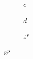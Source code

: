 \begin{frame}
\begin{columns}[T]
\begin{column}{0.6\textwidth}
\begin{figure}
        \begin{subfigure}{0.15\textwidth}
          \caption*{}
        \end{subfigure}
        \begin{subfigure}{0.19\textwidth}
          \centering
          \caption*{$c$}
        \end{subfigure}
        \hspace{0.06\textwidth}
        \begin{subfigure}{0.19\textwidth}
          \centering
          \caption*{$d$}
        \end{subfigure}
        \hspace{0.06\textwidth}
        \begin{subfigure}{0.19\textwidth}
          \centering
          \caption*{$\ep$}
        \end{subfigure}
        
        \vspace{-1em}
        

\end{figure}
\end{column}
\end{columns}
\end{frame}
